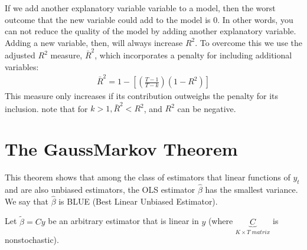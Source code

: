 \documentclass[letterpaper,10pt,english]{jupyterBook}
\begin{document}
If we add another explanatory variable variable to a model, then the
worst outcome that the new variable could add to the model is 0. In
other words, you can not reduce the quality of the model by adding
another explanatory variable. Adding a new variable, then, will always
increase \(R^2\). To overcome this we use the adjusted \(R^2\) measure,
\(\bar R^2\), which incorporates a penalty for including additional
variables:
\begin{equation*}
\begin{split}\bar R^2 = 1 - \left[\left(\frac{T - 1}{T - k}\right) (1 - R^2)\right]\end{split}
\end{equation*}
This measure only increases if its contribution outweighs the penalty
for its inclusion. note that for \(k > 1,\bar R^2 < R^2\), and \(R^2\) can
be negative.


\chapter{The Gauss\sphinxhyphen{}Markov Theorem}
\label{\detokenize{parts/econometric-theory/linearmodels:the-gauss-markov-theorem}}
This theorem shows that among the class of estimators that linear
functions of \(y_t\) and are also unbiased estimators, the OLS estimator
\(\hat\beta\) has the smallest variance. We say that \(\hat \beta\) is BLUE
(Best Linear Unbiased Estimator).

Let \(\tilde \beta = Cy\) be an arbitrary estimator that is linear in \(y\)
(where \(\underbrace{C}_{K \times T \; matrix}\) is non\sphinxhyphen{}stochastic).
\end{document}
